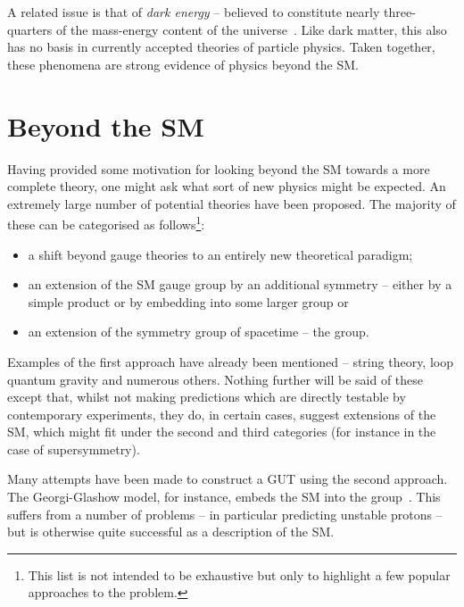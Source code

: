 A related issue is that of \emph{dark energy} -- believed to constitute nearly
three-quarters of the mass-energy content of the
universe~\cite{wmap_7year}. Like dark matter, this also has no basis in
currently accepted theories of particle physics. Taken together, these phenomena
are strong evidence of physics beyond the \ac{SM}.

\section{Beyond the \acl{SM}}
Having provided some motivation for looking beyond the \ac{SM} towards a more
complete theory, one might ask what sort of new physics might be expected. An
extremely large number of potential theories have been proposed. The majority of
these can be categorised as follows\footnote{This list is not intended to be
  exhaustive but only to highlight a few popular approaches to the problem.}:
\begin{itemize}
\item a shift beyond gauge theories to an entirely new theoretical paradigm;
\item an extension of the \ac{SM} gauge group by an additional symmetry -- either
  by a simple product or by embedding into some larger group or
\item an extension of the symmetry group of spacetime -- the \Poincare group.
\end{itemize}

Examples of the first approach have already been mentioned -- string theory, loop
quantum gravity and numerous others. Nothing further will be said of these
except that, whilst not making predictions which are directly testable by
contemporary experiments, they do, in certain cases, suggest extensions of the
\ac{SM}, which might fit under the second and third categories (for instance in
the case of supersymmetry).

Many attempts have been made to construct a \acl{GUT} using the second
approach. The Georgi-Glashow model, for instance, embeds the \ac{SM} into the
\SUfive group~\cite{georgi_glashow}. This suffers from a number of problems -- in
particular predicting unstable protons -- but is otherwise quite successful as a
description of the \ac{SM}.

